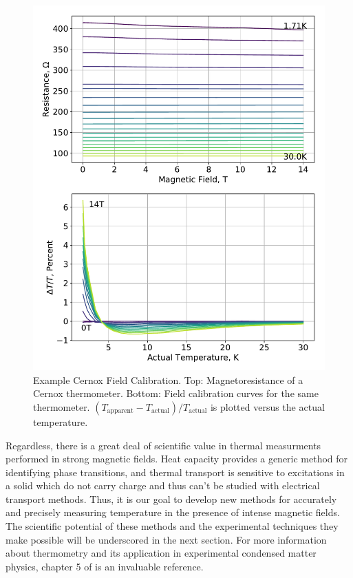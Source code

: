 \documentclass{thesis-umich}
\begin{document}
\begin{figure}
\centering
\includegraphics[width=\textwidth]{figures/cal_cernox_1.pdf}
\caption[Example Cernox Field Calibration]{Example Cernox Field Calibration. Top: Magnetoresistance of a
Cernox thermometer. Bottom: Field calibration curves for the same
thermometer.
\((T_{\mathrm{apparent}} - T_{\mathrm{actual}})/T_{\mathrm{actual}}\) is
plotted versus the actual temperature. \label{cernox_fieldcal}}
\end{figure}

Regardless, there is a great deal of scientific value in thermal
measurments performed in strong magnetic fields. Heat capacity provides
a generic method for identifying phase transitions, and thermal
transport is sensitive to excitations in a solid which do not carry
charge and thus can't be studied with electrical transport methods.
Thus, it is our goal to develop new methods for accurately and precisely
measuring temperature in the presence of intense magnetic fields. The
scientific potential of these methods and the experimental techniques
they make possible will be underscored in the next section. For more
information about thermometry and its application in experimental
condensed matter physics, chapter 5 of \cite{Ekin2006} is an invaluable
reference.
\end{document}
